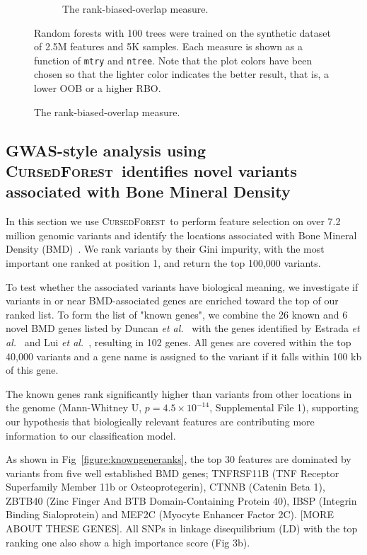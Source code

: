 \documentclass[10pt,letterpaper]{article}
\newcommand{\cursedforest}{\textsc{CursedForest}\xspace}
\newcommand{\mtry}{\texttt{mtry}\xspace}
\newcommand{\ntree}{\texttt{ntree}\xspace}
\begin{document}
\begin{figure}[tbhp]
\begin{adjustwidth}{-1.00in}{0in}
\begin{subfigure}[b]{0.5\linewidth}
      \caption{The rank-biased-overlap measure.} 
      \label{figure:rbo-prod.png} 
    \end{subfigure} 
    \begin{flushleft} 
      Random forests with 100 trees were trained on the synthetic dataset of 2.5M features and 5K samples.
      Each measure is shown as a function of \mtry and \ntree. Note that the plot colors have been chosen so that the lighter color indicates
      the better result, that is, a lower OOB or a higher RBO.
    \end{flushleft}
  \end{adjustwidth}
\end{figure}

\subsection{GWAS-style analysis using \cursedforest\ identifies novel variants associated with Bone Mineral Density}
In this section we use \cursedforest\ to perform feature selection on over 7.2 million genomic variants and identify the
locations associated with Bone Mineral Density (BMD)~\cite{Duncan.2011}. 
We rank variants by their Gini impurity, with the most important one ranked at position 1, and return the top 100,000 variants.

To test whether the associated variants have biological meaning, we investigate if variants in or near
BMD-associated genes are enriched toward the top of our ranked list. To form the list of "known genes", we
combine the 26 known and 6 novel BMD genes listed by Duncan {\it et al.}~\cite{Duncan.2011} with the genes identified by
Estrada {\it et al.}~\cite{Estrada2012} and Lui {\it et al.}~\cite{Liu2008}, resulting in 102 genes.  All genes are covered within the
top 40,000 variants and a gene name is assigned to the variant if it falls within 100 kb of this gene.

The known genes rank significantly higher than variants from other locations in the genome (Mann-Whitney U, $p=4.5\times10^{-14}$, Supplemental File 1), 
supporting our hypothesis that biologically relevant features are contributing more information to our classification model.

As shown in Fig~\ref{figure:knowngeneranks}, the top 30 features are dominated by variants from five well established BMD genes; TNFRSF11B (TNF Receptor Superfamily Member 11b or Osteoprotegerin), CTNNB (Catenin Beta 1), ZBTB40 (Zinc Finger And BTB Domain-Containing Protein 40), IBSP (Integrin Binding Sialoprotein) and MEF2C (Myocyte Enhancer Factor 2C). [MORE ABOUT THESE GENES]. All SNPs in linkage disequilibrium (LD) with the top ranking one also show a high importance score (Fig 3b). %
\end{document}
